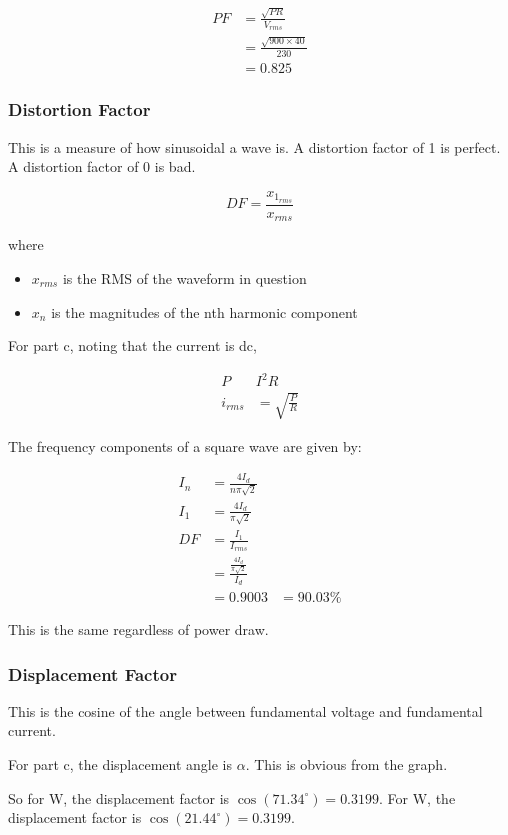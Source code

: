 \begin{align*}
PF & = \frac{\sqrt{PR}}{V_{rms}} \\
   & = \frac{\sqrt{900 \times 40}}{230} \\
   & = 0.825
\end{align*}

\subsubsection*{Distortion Factor}

This is a measure of how sinusoidal a wave is.
A distortion factor of 1 is perfect. A distortion factor of 0 is bad.

$$
DF = \frac{x_{1_{rms}}}{x_{rms}}
$$

where
\begin{itemize}
    \item $x_{rms}$ is the RMS of the waveform in question
    \item $x_n$ is the magnitudes of the nth harmonic component
\end{itemize}

For part c, noting that the current is dc,

\begin{align*}
P       & I^2 R \\
i_{rms} & = \sqrt{\frac{P}{R}}
\end{align*}

The frequency components of a square wave are given by:

\begin{align*}
I_n & = \frac{4I_{d}}{n\pi\sqrt{2}}  \\
I_1 & = \frac{4I_{d}}{\pi\sqrt{2}}  \\
DF & = \frac{I_1}{I_{rms}} \\
   & = \frac{\frac{4I_{d}}{\pi\sqrt{2}}}{I_d} \\
   & = 0.9003
   & = 90.03\%
\end{align*}

This is the same regardless of power draw.

\subsubsection*{Displacement Factor}

This is the cosine of the angle between fundamental voltage and fundamental current.

For part c, the displacement angle is $\alpha$. This is obvious from the graph.

So for \unit[100]{W}, the displacement factor is
$
\cos(71.34^\circ) = 0.3199
$.
For \unit[900]{W}, the displacement factor is
$
\cos(21.44^\circ) = 0.3199
$.